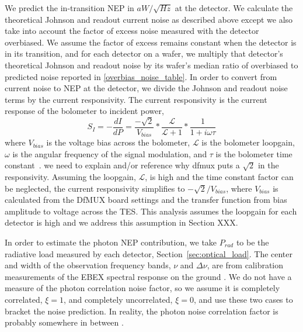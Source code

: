 We predict the in-transition \ac{NEP} in $aW/\sqrt{Hz}$ at the detector. 
We calculate the theoretical Johnson and readout current noise as described above except we also take into account the factor of excess noise measured with the detector overbiased. 
We assume the factor of excess remains constant when the detector is in its transition, and for each detector on a wafer, we multiply that detector's theoretical Johnson and readout noise by its wafer's median ratio of overbiased to predicted noise reported in \TAB\ref{overbias_noise_table}. 
In order to convert from current noise to \ac{NEP} at the detector, we divide the Johnson and readout noise terms by the current responsivity. 
The current responsivity is the current response of the bolometer to incident power,
\begin{equation}
S_I = -\frac{dI}{dP} = \frac{-\sqrt{2}}{V_{bias}} * \frac{\mathcal{L}}{\mathcal{L} + 1} * \frac{1}{1 + i\omega\tau}
\label{eq:current_responsivity}
\end{equation}
where $V_{bias}$ is the voltage bias across the bolometer, $\mathcal{L}$ is the bolometer loopgain, $\omega$ is the angular frequency of the signal modulation, and $\tau$ is the bolometer time constant~\citep{aubin_thesis}. we need to explain and/or reference why dfmux puts a $\sqrt{2}$ in the responsivity.
Assuming the loopgain, $\mathcal{L}$, is high and the time constant factor can be neglected, the current responsivity simplifies to $-\sqrt{2}/V_{bias}$, where $V_{bias}$ is calculated from the \ac{DfMUX} board settings and the transfer function from bias amplitude to voltage across the \ac{TES}. 
This analysis assumes the loopgain for each detector is high and we address this assumption in Section XXX. 

In order to estimate the photon \ac{NEP} contribution, we take $P_{rad}$ to be the radiative load measured by each detector, Section~\ref{sec:optical_load}. 
The center and width of the observation frequency bands, $\nu$ and $\Delta \nu$, are from calibration measurements of the \ac{EBEX} spectral response on the ground \citep{Zilic_thesis}. 
We do not have a measure of the photon correlation noise factor, so we assume it is completely correlated, $\xi=1$, and completely uncorrelated, $\xi=0$, and use these two cases to bracket the noise prediction. 
In reality, the photon noise correlation factor is probably somewhere in between \cite{}. 

